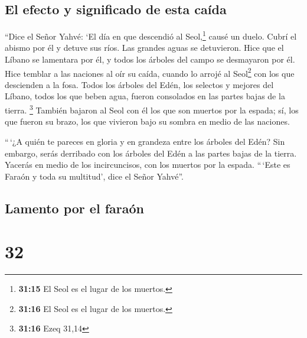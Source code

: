\hypertarget{el-efecto-y-significado-de-esta-cauxedda}{%
\subsection{El efecto y significado de esta
caída}\label{el-efecto-y-significado-de-esta-cauxedda}}

 ``Dice el Señor Yahvé: `El día en que descendió al
Seol,\footnote{\textbf{31:15} El Seol es el lugar de los muertos.} causé
un duelo. Cubrí el abismo por él y detuve sus ríos. Las grandes aguas se
detuvieron. Hice que el Líbano se lamentara por él, y todos los árboles
del campo se desmayaron por él.  Hice temblar a las
naciones al oír su caída, cuando lo arrojé al Seol\footnote{\textbf{31:16}
  El Seol es el lugar de los muertos.} con los que descienden a la fosa.
Todos los árboles del Edén, los selectos y mejores del Líbano, todos los
que beben agua, fueron consolados en las partes bajas de la tierra.
\footnote{\textbf{31:16} Ezeq 31,14}  También bajaron al
Seol con él los que son muertos por la espada; sí, los que fueron su
brazo, los que vivieron bajo su sombra en medio de las naciones.

 ``\,`¿A quién te pareces en gloria y en grandeza entre
los árboles del Edén? Sin embargo, serás derribado con los árboles del
Edén a las partes bajas de la tierra. Yacerás en medio de los
incircuncisos, con los muertos por la espada. ``\,`Este es Faraón y toda
su multitud', dice el Señor Yahvé''.

\hypertarget{lamento-por-el-farauxf3n}{%
\subsection{Lamento por el faraón}\label{lamento-por-el-farauxf3n}}

\hypertarget{section-31}{%
\section{32}\label{section-31}}

